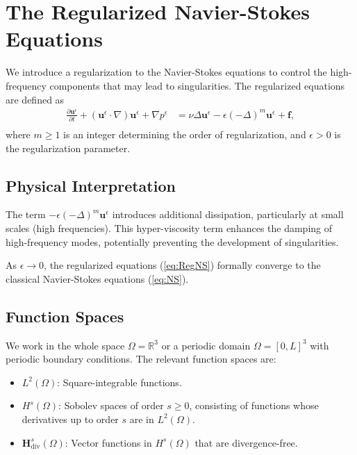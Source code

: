 \documentclass[11pt]{article}
\begin{document}
\section{The Regularized Navier-Stokes Equations}

We introduce a regularization to the Navier-Stokes equations to control the high-frequency components that may lead to singularities. The regularized equations are defined as
\begin{equation}
\begin{aligned}
\frac{\partial \mathbf{u}^\epsilon}{\partial t} + (\mathbf{u}^\epsilon \cdot \nabla)\mathbf{u}^\epsilon + \nabla p^\epsilon &= \nu \Delta \mathbf{u}^\epsilon - \epsilon (-\Delta)^m \mathbf{u}^\epsilon + \mathbf{f}, \\
\end{aligned}
\label{eq:RegNS}
\end{equation}
where $m \geq 1$ is an integer determining the order of regularization, and $\epsilon > 0$ is the regularization parameter.

\subsection{Physical Interpretation}

The term $- \epsilon (-\Delta)^m \mathbf{u}^\epsilon$ introduces additional dissipation, particularly at small scales (high frequencies). This hyper-viscosity term enhances the damping of high-frequency modes, potentially preventing the development of singularities.

As $\epsilon \to 0$, the regularized equations (\ref{eq:RegNS}) formally converge to the classical Navier-Stokes equations (\ref{eq:NS}).

\subsection{Function Spaces}

We work in the whole space $\Omega = \mathbb{R}^3$ or a periodic domain $\Omega = [0, L]^3$ with periodic boundary conditions. The relevant function spaces are:

\begin{itemize}[itemsep=0pt]
    \item $L^2(\Omega)$: Square-integrable functions.
    \item $H^s(\Omega)$: Sobolev spaces of order $s \geq 0$, consisting of functions whose derivatives up to order $s$ are in $L^2(\Omega)$.
    \item $\mathbf{H}^s_{\text{div}}(\Omega)$: Vector functions in $H^s(\Omega)$ that are divergence-free.
\end{itemize}
\end{document}
